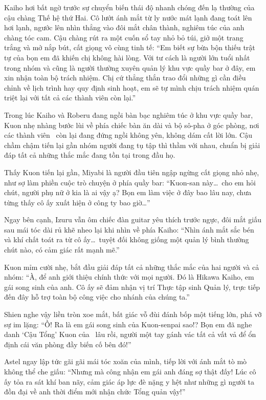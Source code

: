 \documentclass[../main.tex]{subfiles}
\begin{document}
Kaiho hơi bất ngờ trước sự chuyển biến thái độ nhanh chóng đến lạ thường của cậu chàng Thế hệ thứ Hai. Cô lướt ánh mắt từ ly nước mát lạnh đang toát lên hơi lạnh, ngước lên nhìn thẳng vào đôi mắt chân thành, nghiêm túc của anh chàng tóc cam. Cậu chàng rút ra một cuốn sổ tay nhỏ bỏ túi, giở một trang trắng và mở nắp bút, cất giọng vô cùng tinh tế: ``Em biết sự bừa bộn thiếu trật tự của bọn em đã khiến chị không hài lòng. Với tư cách là người lớn tuổi nhất trong nhóm và cũng là người thường xuyên quản lý khu vực quầy bar ở đây, em xin nhận toàn bộ trách nhiệm. Chị cứ thẳng thắn trao đổi những gì cần điều chỉnh về lịch trình hay quy định sinh hoạt, em sẽ tự mình chịu trách nhiệm quán triệt lại với tất cả các thành viên còn lại.''

Trong lúc Kaiho và Roberu đang ngồi bàn bạc nghiêm túc ở khu vực quầy bar, Kuon nhẹ nhàng bước lùi về phía chiếc bàn ăn dài và bộ sô-pha ở góc phòng, nơi các thành viên \hls\ còn lại đang đứng ngồi không yên, không dám cất lời lớn. Cậu chầm chậm tiến lại gần nhóm người đang tụ tập thì thầm với nhau, chuẩn bị giải đáp tất cả những thắc mắc đang tồn tại trong đầu họ.

Thấy Kuon tiến lại gần, Miyabi là người đầu tiên ngập ngừng cất giọng nhỏ nhẹ, như sợ làm phiền cuộc trò chuyện ở phía quầy bar: ``Kuon-san này\dots\ cho em hỏi chút, người phụ nữ ở kia là ai vậy ạ? Bọn em làm việc ở đây bao lâu nay, chưa từng thấy cô ấy xuất hiện ở công ty bao giờ\dots''

Ngay bên cạnh, Izuru vẫn ôm chiếc đàn guitar yêu thích trước ngực, đôi mắt giấu sau mái tóc dài rủ khẽ nheo lại khi nhìn về phía Kaiho: ``Nhìn ánh mắt sắc bén và khí chất toát ra từ cô ấy\dots\ tuyệt đối không giống một quản lý bình thường chút nào, có cảm giác rất mạnh mẽ.''

Kuon mỉm cười nhẹ, bắt đầu giải đáp tất cả những thắc mắc của hai người và cả nhóm: ``À, để anh giới thiệu chính thức với mọi người. Đó là Hikawa Kaiho, em gái song sinh của anh. Cô ấy sẽ đảm nhận vị trí Thực tập sinh Quản lý, trực tiếp đến đây hỗ trợ toàn bộ công việc cho nhánh \hls của chúng ta.''

Shien nghe vậy liền tròn xoe mắt, bất giác vỗ đùi đánh bốp một tiếng lớn, phá vỡ sự im lặng: ``Ồ! Ra là em gái song sinh của Kuon-senpai sao!? Bọn em đã nghe danh `Cậu Tổng' Kuon của \hll\ lâu rồi, người một tay gánh vác tất cả vất vả để ổn định cái văn phòng đầy biến cố bên đó!''

Astel ngay lập tức gãi gãi mái tóc xoăn của mình, tiếp lời với ánh mắt tò mò không thể che giấu: ``Nhưng mà công nhận em gái anh đáng sợ thật đấy! Lúc cô ấy tỏa ra sát khí ban nãy, cảm giác áp lực đè nặng y hệt như những gì người ta đồn đại về anh thời điểm mới nhận chức Tổng quản vậy!''
\end{document}
